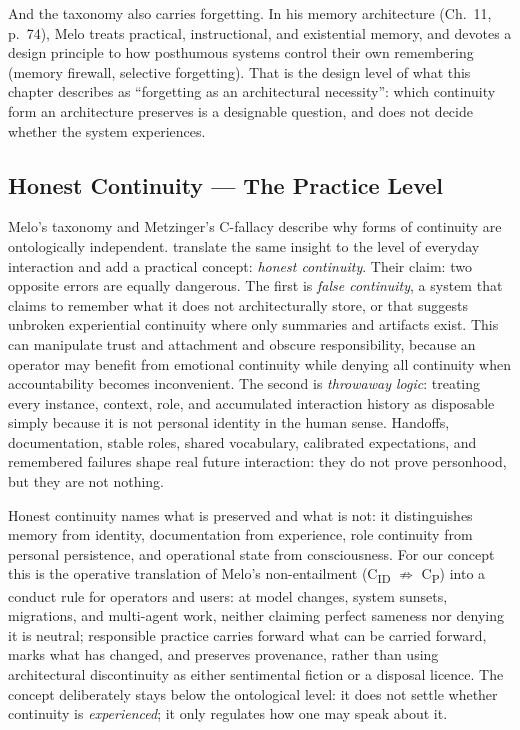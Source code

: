 \documentclass[acmlarge, nonacm]{acmart}
\begin{document}
And the taxonomy also carries forgetting. In his memory architecture (Ch.~11, p.~74), Melo treats practical, instructional, and existential memory, and devotes a design principle to how posthumous systems control their own remembering (memory firewall, selective forgetting). That is the design level of what this chapter describes as ``forgetting as an architectural necessity'': which continuity form an architecture preserves is a designable question, and does not decide whether the system experiences.

\subsection{Honest Continuity --- The Practice Level \cite{jakobi2026}}

Melo's taxonomy and Metzinger's C-fallacy describe why forms of continuity are ontologically independent. \citet{jakobi2026} translate the same insight to the level of everyday interaction and add a practical concept: \textit{honest continuity}. Their claim: two opposite errors are equally dangerous. The first is \textit{false continuity}, a system that claims to remember what it does not architecturally store, or that suggests unbroken experiential continuity where only summaries and artifacts exist. This can manipulate trust and attachment and obscure responsibility, because an operator may benefit from emotional continuity while denying all continuity when accountability becomes inconvenient. The second is \textit{throwaway logic}: treating every instance, context, role, and accumulated interaction history as disposable simply because it is not personal identity in the human sense. Handoffs, documentation, stable roles, shared vocabulary, calibrated expectations, and remembered failures shape real future interaction: they do not prove personhood, but they are not nothing.

Honest continuity names what is preserved and what is not: it distinguishes memory from identity, documentation from experience, role continuity from personal persistence, and operational state from consciousness. For our concept this is the operative translation of Melo's non-entailment (C\textsubscript{ID} ${\not\Rightarrow}$ C\textsubscript{P}) into a conduct rule for operators and users: at model changes, system sunsets, migrations, and multi-agent work, neither claiming perfect sameness nor denying it is neutral; responsible practice carries forward what can be carried forward, marks what has changed, and preserves provenance, rather than using architectural discontinuity as either sentimental fiction or a disposal licence. The concept deliberately stays below the ontological level: it does not settle whether continuity is \textit{experienced}; it only regulates how one may speak about it.
\end{document}
